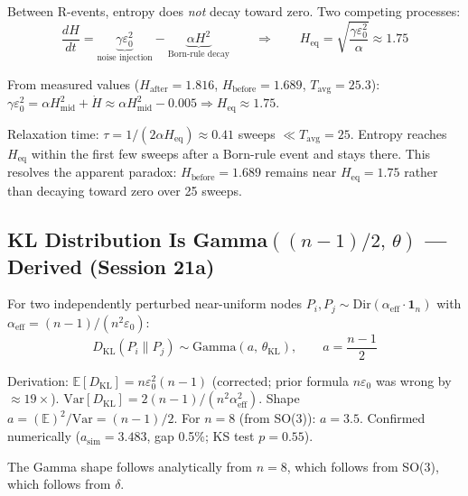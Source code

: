 \documentclass[12pt, a4paper]{article}
\begin{document}
\begin{derivedbox}[title={$H_{\mathrm{eq}} \approx 1.75$ --- Entropy Does Not Decay to Zero}]
Between R-events, entropy does \emph{not} decay toward zero. Two competing processes:
\[
  \frac{dH}{dt} = \underbrace{\gamma\varepsilon_0^2}_{\text{noise injection}}
                 - \underbrace{\alpha H^2}_{\text{Born-rule decay}}
  \qquad\Rightarrow\qquad
  H_{\mathrm{eq}} = \sqrt{\frac{\gamma\varepsilon_0^2}{\alpha}} \approx 1.75
\]

From measured values ($H_{\mathrm{after}} = 1.816$, $H_{\mathrm{before}} = 1.689$,
$T_{\mathrm{avg}} = 25.3$):
$\gamma\varepsilon_0^2 = \alpha H_{\mathrm{mid}}^2 + \dot{H} \approx \alpha H_{\mathrm{mid}}^2
- 0.005 \Rightarrow H_{\mathrm{eq}} \approx 1.75$.

Relaxation time: $\tau = 1/(2\alpha H_{\mathrm{eq}}) \approx 0.41$ sweeps $\ll T_{\mathrm{avg}} = 25$.
Entropy reaches $H_{\mathrm{eq}}$ within the first few sweeps after a Born-rule event and
stays there. This resolves the apparent paradox: $H_{\mathrm{before}} = 1.689$ remains near
$H_{\mathrm{eq}} = 1.75$ rather than decaying toward zero over 25 sweeps.
\end{derivedbox}

\subsection{KL Distribution Is Gamma$((n-1)/2,\,\theta)$ --- Derived (Session 21a)}

\begin{derivedbox}[title={Shape Parameter $a = (n-1)/2$ from $\delta$-Chain}]
For two independently perturbed near-uniform nodes $P_i, P_j \sim \mathrm{Dir}(\alpha_{\mathrm{eff}}\cdot\mathbf{1}_n)$
with $\alpha_{\mathrm{eff}} = (n-1)/(n^2\varepsilon_0)$:
\[
  D_{\mathrm{KL}}(P_i\|P_j) \sim \mathrm{Gamma}(a,\,\theta_{\mathrm{KL}}),
  \qquad a = \frac{n-1}{2}
\]

Derivation: $\mathbb{E}[D_{\mathrm{KL}}] = n\varepsilon_0^2(n-1)$ (corrected; prior formula $n\varepsilon_0$
was wrong by $\approx 19\times$).
$\mathrm{Var}[D_{\mathrm{KL}}] = 2(n-1)/(n^2\alpha_{\mathrm{eff}}^2)$.
Shape $a = (\mathbb{E})^2/\mathrm{Var} = (n-1)/2$.
For $n = 8$ (from SO(3)): $a = 3.5$. Confirmed numerically ($a_{\mathrm{sim}} = 3.483$, gap 0.5\%;
KS test $p = 0.55$).

The Gamma shape follows analytically from $n = 8$, which follows from SO(3), which follows
from $\delta$.
\end{derivedbox}
\end{document}
